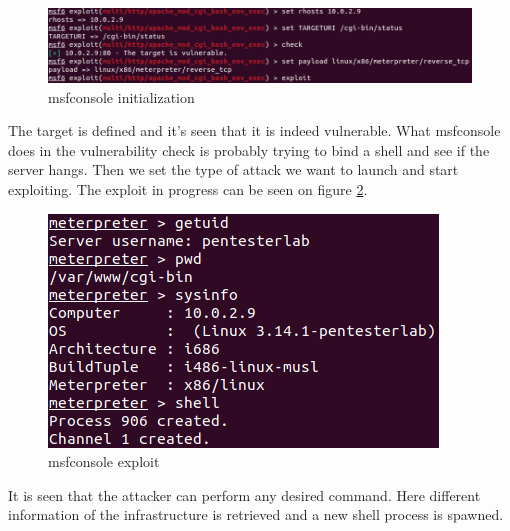 \begin{figure} [ht]
    \centering
    \includegraphics[width=\columnwidth]{../pictures/msfconsole-init.png}
    \caption{msfconsole initialization}
    \label{fig:msfconsole-init}
\end{figure}
The target is defined and it's seen that it is indeed vulnerable. What msfconsole does in the vulnerability check is probably trying to bind a shell and see if the server hangs. Then we set the type of attack we want to launch and start exploiting. The exploit in progress can be seen on figure \ref{fig:msfconsole-exploit}. 

\begin{figure} [ht]
    \centering
    \includegraphics[width=\columnwidth]{../pictures/msfconsole-exploit.png}
    \caption{msfconsole exploit}
    \label{fig:msfconsole-exploit}
\end{figure}

It is seen that the attacker can perform any desired command. Here different information of the infrastructure is retrieved and a new shell process is spawned. 